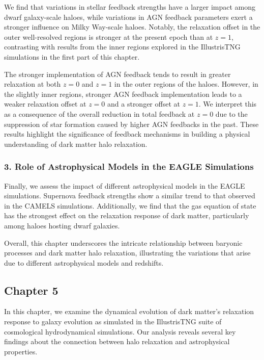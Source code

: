\documentclass[a4paper, 12pt, oneside]{Thesis}  %
\begin{document}
We find that variations in stellar feedback strengths have a larger impact among dwarf galaxy-scale haloes, while variations in AGN feedback parameters exert a stronger influence on Milky Way-scale haloes. Notably, the relaxation offset in the outer well-resolved regions is stronger at the present epoch than at \( z=1 \), contrasting with results from the inner regions explored in the IllustrisTNG simulations in the first part of this chapter.

The stronger implementation of AGN feedback tends to result in greater relaxation at both \( z=0 \) and \( z=1 \) in the outer regions of the haloes. However, in the slightly inner regions, stronger AGN feedback implementation leads to a weaker relaxation offset at \( z=0 \) and a stronger offset at \( z=1 \). We interpret this as a consequence of the overall reduction in total feedback at \( z=0 \) due to the suppression of star formation caused by higher AGN feedbacks in the past. These results highlight the significance of feedback mechanisms in building a physical understanding of dark matter halo relaxation.

\subsubsection*{3. Role of Astrophysical Models in the EAGLE Simulations}
Finally, we assess the impact of different astrophysical models in the EAGLE simulations. Supernova feedback strengths show a similar trend to that observed in the CAMELS simulations. Additionally, we find that the gas equation of state has the strongest effect on the relaxation response of dark matter, particularly among haloes hosting dwarf galaxies.

Overall, this chapter underscores the intricate relationship between baryonic processes and dark matter halo relaxation, illustrating the variations that arise due to different astrophysical models and redshifts.




\subsection*{Chapter 5}

In this chapter, we examine the dynamical evolution of dark matter's relaxation response to galaxy evolution as simulated in the IllustrisTNG suite of cosmological hydrodynamical simulations. Our analysis reveals several key findings about the connection between halo relaxation and astrophysical properties.
\end{document}
